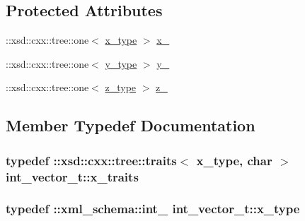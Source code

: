 \subsection*{Protected Attributes}
\begin{DoxyCompactItemize}
\item 
\+::xsd\+::cxx\+::tree\+::one$<$ \hyperlink{classint__vector__t_a707ce51b5d31dcba928e26f41fa36cfa}{x\+\_\+type} $>$ \hyperlink{classint__vector__t_a2d1f7567a00dcd03634f576acf27ea93}{x\+\_\+}
\item 
\+::xsd\+::cxx\+::tree\+::one$<$ \hyperlink{classint__vector__t_a7aa2a9276bdee3fad0e216343485a844}{y\+\_\+type} $>$ \hyperlink{classint__vector__t_a2868a6aa13498be4826f4c76e37eeecc}{y\+\_\+}
\item 
\+::xsd\+::cxx\+::tree\+::one$<$ \hyperlink{classint__vector__t_a20a60edf9f56f9455dc62b4e5f547bc3}{z\+\_\+type} $>$ \hyperlink{classint__vector__t_ac10fc1d107a32a8515947d1aa4e29f3a}{z\+\_\+}
\end{DoxyCompactItemize}


\subsection{Member Typedef Documentation}
\subsubsection[{\texorpdfstring{x\+\_\+traits}{x_traits}}]{\setlength{\rightskip}{0pt plus 5cm}typedef \+::xsd\+::cxx\+::tree\+::traits$<$ {\bf x\+\_\+type}, char $>$ {\bf int\+\_\+vector\+\_\+t\+::x\+\_\+traits}}\hypertarget{classint__vector__t_a43010f516b3ee7806207d1234253c680}{}\label{classint__vector__t_a43010f516b3ee7806207d1234253c680}
\subsubsection[{\texorpdfstring{x\+\_\+type}{x_type}}]{\setlength{\rightskip}{0pt plus 5cm}typedef \+::{\bf xml\+\_\+schema\+::int\+\_\+} {\bf int\+\_\+vector\+\_\+t\+::x\+\_\+type}}\hypertarget{classint__vector__t_a707ce51b5d31dcba928e26f41fa36cfa}{}\label{classint__vector__t_a707ce51b5d31dcba928e26f41fa36cfa}
